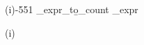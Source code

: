 


\fontinstcc
\for(i){-5}{5}{1}
   \eval_expr_to\b_count{}
   \eval_expr{}
   \immediate{}
\endfor(i)
\normalcc

\bye
